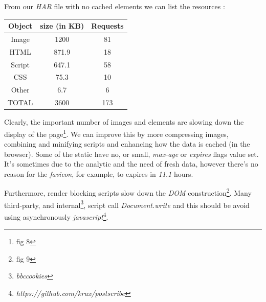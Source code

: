 \documentclass[conference]{IEEEtran}
\begin{document}
From our \textit{HAR} file with no cached elements we can list the resources : 

\begin{table}[h!]
     \centering
     \begin{tabular}{|c|c|c|}
        \hline
        
        Object & size (in KB) & Requests 
    \\
        \hline
        Image & 1200 & 81 \\
        HTML & 871.9 & 18 \\
        Script & 647.1 & 58 \\
        CSS & 75.3 & 10 \\
        Other & 6.7 & 6 \\
        TOTAL & 3600 &  173 \\
        \hline
    \end{tabular}
     \label{tab:my_label}
 \end{table}
 
 Clearly, the important number of images and elements are slowing down the display of the page\footnote{fig 8}. We can improve this by more compressing images, combining and minifying scripts and enhancing how the data is cached (in the browser). Some of the static have no, or small, \textit{max-age} or \textit{expires} flags value set. It's sometimes due to the analytic and the need of fresh data, however there's no reason for the \textit{favicon}, for example, to expires in \textit{11.1} hours. 
 
 Furthermore, render blocking scripts slow down the \textit{DOM} construction\footnote{fig 9}. Many third-party, and internal\footnote{\textit{bbccookies}}, script call \textit{Document.write} and this should be avoid using asynchronously \textit{javascript}\footnote{\textit{https://github.com/krux/postscribe}}. 
 

 


\end{document}
